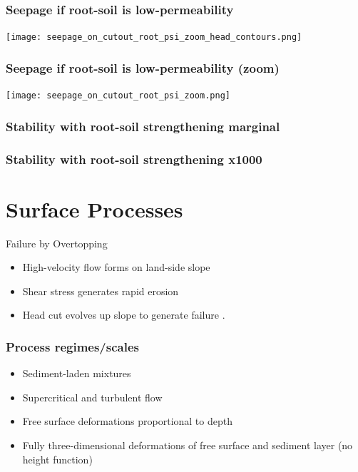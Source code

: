 \documentclass{beamer}
\begin{document}
\begin{frame}
\frametitle{Seepage if root-soil is low-permeability}
\texttt{[image: seepage\_on\_cutout\_root\_psi\_zoom\_head\_contours.png]}
\end{frame}  

\begin{frame}
\frametitle{Seepage if root-soil is low-permeability (zoom)}
\texttt{[image: seepage\_on\_cutout\_root\_psi\_zoom.png]}
\end{frame}  

\begin{frame}
\frametitle{Stability with root-soil strengthening marginal}
\end{frame}  

\begin{frame}
\frametitle{Stability with root-soil strengthening x1000}
\end{frame}  

\section{Surface Processes}

\begin{frame}{Failure by Overtopping}
\begin{itemize}
\item High-velocity flow forms on land-side slope
\item Shear stress generates rapid erosion 
\item Head cut evolves up slope to generate failure \cite{Briaud_Chen_etal_08}.
\end{itemize}
\end{frame}

\begin{frame}
\frametitle{Process regimes/scales}
\begin{itemize}
\item Sediment-laden mixtures
\item Supercritical and turbulent flow
\item Free surface deformations proportional to depth
\item Fully three-dimensional deformations of free surface and sediment layer (no height function)
\end{itemize}
\end{frame}
\end{document}
